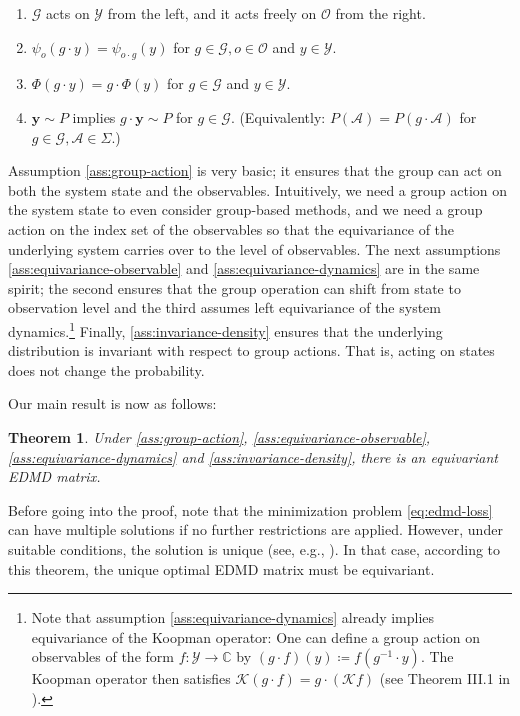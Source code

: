 \documentclass[preprint,12pt,authoryear]{elsarticle}
\newcommand{\C}{\mathbb{C}}
\newcommand\Kc{\mathcal K}
\newcommand\Ac{\mathcal A}
\newcommand\Gc{\mathcal G}
\newcommand\Oc{\mathcal O}
\newcommand\Yc{\mathcal Y}
\newcommand\Koopman{\Kc}
\newtheorem{theorem}{Theorem}[section]
\begin{document}
{\begin{enumerate}[noitemsep, label=\normalfont{(\textbf{A\arabic*})}]
    \item $\Gc$ acts on $\Yc$ from the left, and it acts freely on $\Oc$ from the right.
    \label{ass:group-action}
    \item $\psi_o(g \cdot y) = \psi_{o \cdot g}(y)$ for $g \in \Gc, o \in \Oc$ and $y \in \Yc$.
    \label{ass:equivariance-observable}
    \item $\Phi(g \cdot y) = g \cdot \Phi(y)$ for $g \in \Gc$ and $y \in \Yc$. \label{ass:equivariance-dynamics}
    \item $\bm y \sim P$ implies $g \cdot \bm y \sim P$ for $g\in \Gc$. (Equivalently: $P(\Ac) = P(g \cdot \Ac)$ for $g \in \Gc, \Ac \in \Sigma$.) %
    \label{ass:invariance-density}
\end{enumerate}
Assumption \ref{ass:group-action} is very basic; it ensures that the group can act on both the system state and the observables. Intuitively, we need a group action on the system state to even consider group-based methods, and we need a group action on the index set of the observables so that the equivariance of the underlying system carries over to the level of observables. The next assumptions \ref{ass:equivariance-observable} and \ref{ass:equivariance-dynamics} are in the same spirit; the second ensures that the group operation can shift from state to observation level and the third assumes left equivariance of the system dynamics.\footnote{Note that assumption \ref{ass:equivariance-dynamics} already implies equivariance of the Koopman operator: One can define a group action on observables of the form $f : \Yc \rightarrow \C$ by $(g \cdot f)(y) \coloneqq f(g^{-1} \cdot y)$. The Koopman operator then satisfies
$
    \Koopman (g \cdot f) = g \cdot (\Koopman f)
$
(see Theorem III.1 in \cite{salovaKoopmanOperatorIts2019}).} Finally, \ref{ass:invariance-density} ensures that the underlying distribution is invariant with respect to group actions. That is, acting on states does not change the probability.

Our main result is now as follows:

\begin{theorem}
    \label{thr:convolution}
    Under \ref{ass:group-action}, \ref{ass:equivariance-observable}, \ref{ass:equivariance-dynamics} and \ref{ass:invariance-density}, %
    there is an equivariant EDMD matrix.%
\end{theorem}

Before going into the proof, note that the minimization problem \eqref{eq:edmd-loss} can have multiple solutions if no further restrictions are applied. However, under suitable conditions, the solution is unique (see, e.g., \cite[Lemma C.2]{PSB+24}). In that case, according to this theorem, the unique optimal EDMD matrix must be equivariant. 

}
\end{document}
